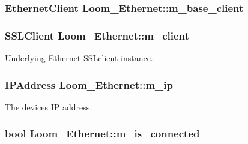\subsubsection[{\texorpdfstring{m\+\_\+base\+\_\+client}{m_base_client}}]{\setlength{\rightskip}{0pt plus 5cm}Ethernet\+Client Loom\+\_\+\+Ethernet\+::m\+\_\+base\+\_\+client\hspace{0.3cm}{\ttfamily [protected]}}\hypertarget{class_loom___ethernet_a9d0214994b52ec9932906ccfb5593a9d}{}\label{class_loom___ethernet_a9d0214994b52ec9932906ccfb5593a9d}
\subsubsection[{\texorpdfstring{m\+\_\+client}{m_client}}]{\setlength{\rightskip}{0pt plus 5cm}S\+S\+L\+Client Loom\+\_\+\+Ethernet\+::m\+\_\+client\hspace{0.3cm}{\ttfamily [protected]}}\hypertarget{class_loom___ethernet_ade9af6aab7a240375cc4f4786b8b0b04}{}\label{class_loom___ethernet_ade9af6aab7a240375cc4f4786b8b0b04}


Underlying Ethernet S\+S\+Lclient instance. 

\subsubsection[{\texorpdfstring{m\+\_\+ip}{m_ip}}]{\setlength{\rightskip}{0pt plus 5cm}I\+P\+Address Loom\+\_\+\+Ethernet\+::m\+\_\+ip\hspace{0.3cm}{\ttfamily [protected]}}\hypertarget{class_loom___ethernet_ab7b3e7573fa75b43d99d99cec21b6a86}{}\label{class_loom___ethernet_ab7b3e7573fa75b43d99d99cec21b6a86}


The devices IP address. 

\subsubsection[{\texorpdfstring{m\+\_\+is\+\_\+connected}{m_is_connected}}]{\setlength{\rightskip}{0pt plus 5cm}bool Loom\+\_\+\+Ethernet\+::m\+\_\+is\+\_\+connected\hspace{0.3cm}{\ttfamily [protected]}}\hypertarget{class_loom___ethernet_a383b518b130bb1342bd8e4eae8c01e29}{}\label{class_loom___ethernet_a383b518b130bb1342bd8e4eae8c01e29}


